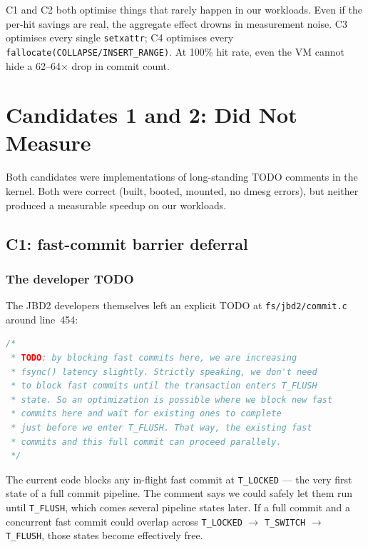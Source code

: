 \documentclass[12pt,a4paper]{article}
\begin{document}
C1 and C2 both optimise things that rarely happen in our workloads.
Even if the per-hit savings are real, the aggregate effect drowns in
measurement noise.  C3 optimises every single \texttt{setxattr}; C4
optimises every \texttt{fallocate(COLLAPSE/INSERT\_RANGE)}.  At 100\%
hit rate, even the VM cannot hide a 62--64$\times$ drop in commit count.

\section{Candidates 1 and 2: Did Not Measure}

Both candidates were implementations of long-standing TODO comments
in the kernel. Both were correct (built, booted, mounted, no
dmesg errors), but neither produced a measurable speedup on our
workloads.

\subsection{C1: fast-commit barrier deferral}

\subsubsection{The developer TODO}

The JBD2 developers themselves left an explicit TODO at
\texttt{fs/jbd2/commit.c} around line~454:

\begin{lstlisting}[language=C]
/*
 * TODO: by blocking fast commits here, we are increasing
 * fsync() latency slightly. Strictly speaking, we don't need
 * to block fast commits until the transaction enters T_FLUSH
 * state. So an optimization is possible where we block new fast
 * commits here and wait for existing ones to complete
 * just before we enter T_FLUSH. That way, the existing fast
 * commits and this full commit can proceed parallely.
 */
\end{lstlisting}

The current code blocks any in-flight fast commit at \texttt{T\_LOCKED}
--- the very first state of a full commit pipeline.  The comment says
we could safely let them run until \texttt{T\_FLUSH}, which comes
several pipeline states later.  If a full commit and a concurrent fast
commit could overlap across \texttt{T\_LOCKED} $\to$ \texttt{T\_SWITCH}
$\to$ \texttt{T\_FLUSH}, those states become effectively free.
\end{document}
